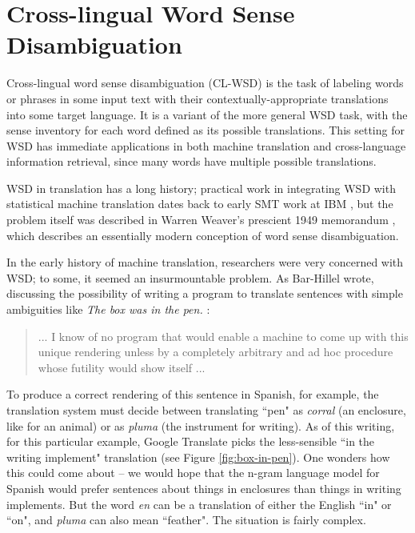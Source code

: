 \section{Cross-lingual Word Sense Disambiguation}

Cross-lingual word sense disambiguation (CL-WSD) is the task of labeling words
or phrases in some input text with their contextually-appropriate translations
into some target language.
It is a variant of the more general WSD task, with the sense inventory for each
word defined as its possible translations.
This setting for WSD has immediate applications in both machine translation and
cross-language information retrieval, since many words have multiple possible
translations.

WSD in translation has a long history; practical work in integrating
WSD with statistical machine translation dates back to early SMT work at IBM
\cite{Brown91word-sensedisambiguation}, but the problem itself was described in
Warren Weaver's prescient 1949 memorandum \cite{weavermemo}, which describes an
essentially modern conception of word sense disambiguation.

In the early history of machine translation, researchers were very concerned
with WSD; to some, it seemed an insurmountable problem. As Bar-Hillel wrote,
discussing the possibility of writing a program to translate sentences with
simple ambiguities like \emph{The box was in the pen.} \cite{barhillel1960}:

\begin{quote}
... I know of no program that would enable a machine to come up with this
unique rendering unless by a completely arbitrary and ad hoc procedure whose
futility would show itself ...
\end{quote}

To produce a correct rendering of this sentence in Spanish, for example, the
translation system must decide between translating ``pen" as \emph{corral} (an
enclosure, like for an animal) or as \emph{pluma} (the instrument for writing).
As of this writing, for this particular example, Google Translate picks the
less-sensible ``in the writing implement" translation (see Figure
\ref{fig:box-in-pen}).
One wonders how this could come about -- we would hope that the n-gram language
model for Spanish would prefer sentences about things in enclosures than things
in writing implements.
But the word \emph{en} can be a translation of either the English ``in" or
``on", and \emph{pluma} can also mean ``feather".
The situation is fairly complex.


